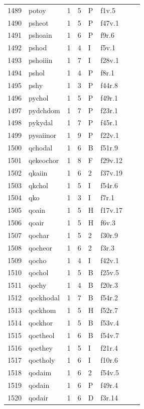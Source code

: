 \documentclass[11pt,a4paper]{article}
\begin{document}
\begin{landscape}
\begin{longtable}{@{}r>{\ttfamily}lrrl>{\ttfamily}l>{\raggedright\arraybackslash}p{80mm}>{\raggedright\arraybackslash}p{36mm}@{}}
1489 & potoy & 1 & 5 & P & f1v.5 &  & \\
1490 & psheot & 1 & 5 & P & f47v.1 &  & \\
1491 & pshoain & 1 & 6 & P & f9r.6 &  & \\
1492 & pshod & 1 & 4 & I & f5v.1 &  & \\
1493 & pshoiiin & 1 & 7 & I & f28v.1 &  & \\
1494 & pshol & 1 & 4 & P & f8r.1 &  & \\
1495 & pshy & 1 & 3 & P & f44r.8 &  & \\
1496 & pychol & 1 & 5 & P & f49r.1 &  & \\
1497 & pydchdom & 1 & 7 & P & f23r.1 &  & \\
1498 & pykydal & 1 & 7 & P & f45r.1 &  & \\
1499 & pysaiinor & 1 & 9 & P & f22v.1 &  & \\
1500 & qchodal & 1 & 6 & B & f51r.9 &  & \\
1501 & qekeochor & 1 & 8 & F & f29v.12 &  & \\
1502 & qkaiin & 1 & 6 & 2 & f37v.19 &  & \\
1503 & qkchol & 1 & 5 & I & f54r.6 &  & \\
1504 & qko & 1 & 3 & I & f7r.1 &  & \\
1505 & qoain & 1 & 5 & H & f17v.17 &  & \\
1506 & qoair & 1 & 5 & H & f6v.3 &  & \\
1507 & qochar & 1 & 5 & 2 & f30r.9 &  & \\
1508 & qocheor & 1 & 6 & 2 & f3r.3 &  & \\
1509 & qocho & 1 & 4 & I & f42v.1 &  & \\
1510 & qochol & 1 & 5 & B & f25v.5 &  & \\
1511 & qochy & 1 & 4 & B & f20r.3 &  & \\
1512 & qockhodal & 1 & 7 & B & f54r.2 &  & \\
1513 & qockhom & 1 & 5 & H & f52r.7 &  & \\
1514 & qockhor & 1 & 5 & B & f53v.4 &  & \\
1515 & qoctheol & 1 & 6 & B & f54v.7 &  & \\
1516 & qocthey & 1 & 5 & I & f21r.4 &  & \\
1517 & qoctholy & 1 & 6 & I & f10r.6 &  & \\
1518 & qodaim & 1 & 6 & 2 & f54v.5 &  & \\
1519 & qodain & 1 & 6 & P & f49r.4 &  & \\
1520 & qodair & 1 & 6 & D & f3r.14 &  & \\

\end{longtable}
\end{landscape}
\end{document}
